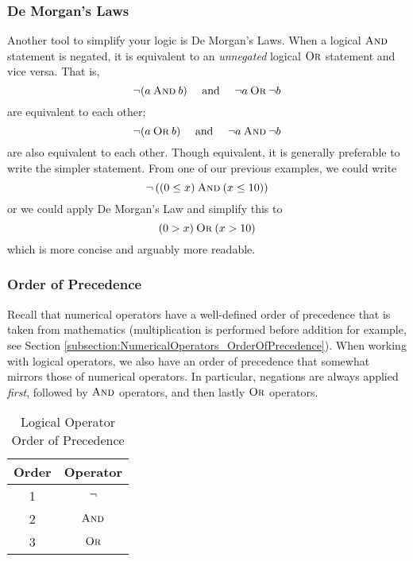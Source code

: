 \subsubsection{De Morgan's Laws}

Another tool to simplify your logic is De Morgan's Laws.  When a logical $\mathbin{\textsc{And}}$
statement is negated, it is equivalent to an \emph{unnegated} logical $\mathbin{\textsc{Or}}$ statement
and vice versa.  That is, 
  $$\neg (a \mathbin{\textsc{And}} b) \quad \textrm{ and } \quad \neg a \mathbin{\textsc{Or}} \neg b$$
are equivalent to each other;  
  $$\neg (a \mathbin{\textsc{Or}} b) \quad \textrm{ and } \quad \neg a \mathbin{\textsc{And}} \neg b$$
are also equivalent to each other.  Though equivalent, it is generally preferable to
write the simpler statement.  From one of our previous examples, we could write
  $$\neg \left( (0 \leq x) \mathbin{\textsc{And}} (x \leq 10) \right)$$
or we could apply De Morgan's Law and simplify this to
  $$(0 > x) \mathbin{\textsc{Or}} (x > 10)$$
which is more concise and arguably more readable.

\subsubsection{Order of Precedence}

Recall that numerical operators have a well-defined order of precedence that is
taken from mathematics (multiplication is performed before addition for example, 
see Section \ref{subsection:NumericalOperators_OrderOfPrecedence}).  When 
working with logical operators, we also have an order of precedence that somewhat
mirrors those of numerical operators.  In particular, negations are always applied
\emph{first}, followed by $\mathbin{\textsc{And}}$ operators, and then lastly $\mathbin{\textsc{Or}}$ operators.  

\begin{table}
\centering
\begin{tabular}{c|c}
Order & Operator \\
\hline\hline
1 & $\neg$ \\
2 & $\mathbin{\textsc{And}}$ \\
3 & $\mathbin{\textsc{Or}}$
\end{tabular}
\caption{Logical Operator Order of Precedence}
\label{table:logicalOperatorOrderOfPrecedence}
\end{table}

